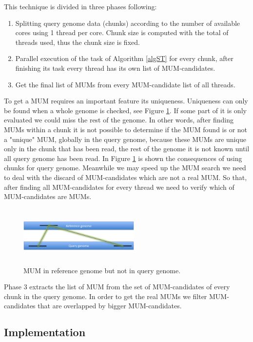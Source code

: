 \documentclass[conference]{IEEEtran}
\begin{document}
This technique is divided in three phases following:
\begin{enumerate}
\item Splitting query genome data (chunks) according to the number of available cores using 1 thread per core. Chunk size is computed with the total of threads used, thus the chunk size is fixed.
\item Parallel execution of the task of Algorithm \ref{algST} for every chunk, after finishing its task every thread has its own list of MUM-candidates.
\item Get the final list of MUMs from every MUM-candidate list of all threads.
\end{enumerate}
To get a MUM requires an important feature its uniqueness. Uniqueness can only be found when a whole genome is checked, see Figure \ref{Whole-MUM}. If some part of it is only evaluated we could miss the rest of the genome. In other words, after finding MUMs within a chunk it is not possible to determine if the MUM found is or not a "unique" MUM, globally in the query genome,  because these MUMs are unique only in the chunk that has been read, the rest of the genome it is not known until all query genome has been read. In Figure \ref{Whole-MUM} is shown the consequences of using chunks for query genome. Meanwhile we may speed up the MUM search we need to deal with the discard of MUM-candidates which are not a real MUM. So that, after finding all MUM-candidates for every thread we need to verify which of MUM-candidates are MUMs.

\begin{figure}[htb]  
\begin{center} 
  \includegraphics[width=6cm,height=3cm]{Whole-MUM.png}
\end{center} 
\caption{MUM in reference genome but not in query genome.} 
\label{Whole-MUM} 
\end{figure}

Phase 3 extracts the list of MUM from the set of MUM-candidates of every chunk in the query genome. In order to get the real MUMs we filter MUM-candidates that are overlapped by bigger MUM-candidates.
\subsection*{Implementation} 
\label{implementation}
\end{document}
